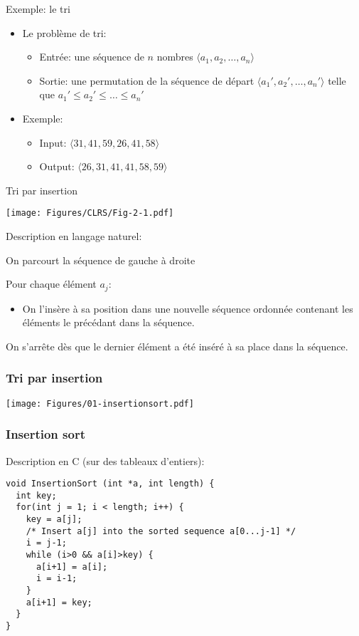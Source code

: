 
\begin{frame}{Exemple: le tri}
\begin{itemize}
\item Le problème de tri:
\begin{itemize}
\item Entrée: une séquence de $n$ nombres $\langle a_1,a_2,\ldots,a_n\rangle$
\item Sortie: une permutation de la séquence de départ $\langle a_1',a_2',\ldots,a_n'\rangle$ telle que $a_1'\leq a_2'\leq\ldots\leq a_n'$
\end{itemize}
\bigskip
\item Exemple:
\begin{itemize}
\item Input: $\langle 31,41,59,26,41,58\rangle$
\item Output: $\langle 26,31,41,41,58,59\rangle$
\end{itemize}
\end{itemize}

\end{frame}

\begin{frame}{Tri par insertion}

\hfill\texttt{[image: Figures/CLRS/Fig-2-1.pdf]}

Description en langage naturel:


\bigskip

On parcourt la séquence de gauche à droite

\bigskip

Pour chaque élément $a_j$:
\begin{itemize}
\item On l'{\alert{insère}} à sa position dans une nouvelle séquence ordonnée contenant les éléments le précédant dans la séquence.
\end{itemize}
On s'arrête dès que le dernier élément a été inséré à sa place dans la séquence.

\end{frame}

\begin{frame}
\frametitle{Tri par insertion}
\centerline{\texttt{[image: Figures/01-insertionsort.pdf]}}
\end{frame}

\begin{frame}[fragile]
\frametitle{Insertion sort}

Description en C (sur des tableaux d'entiers):

{\small
\begin{verbatim}
void InsertionSort (int *a, int length) {
  int key;
  for(int j = 1; i < length; i++) {
    key = a[j];
    /* Insert a[j] into the sorted sequence a[0...j-1] */
    i = j-1;
    while (i>0 && a[i]>key) {
      a[i+1] = a[i];
      i = i-1;
    }
    a[i+1] = key;
  }
}
\end{verbatim}
}

\end{frame}

